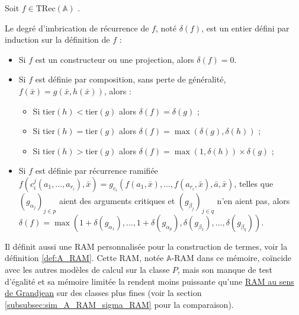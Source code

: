\documentclass{report}
\newcommand{\bbA}{\mathbb{A}}
\newcommand{\TRec}[1]{\text{TRec}\left(\mathbb{#1}\right)}
\begin{document}
		
		\begin{definition}
			\label{def:degre_recurrence}
			
			Soit $f \in \TRec{A}$ \footnotemark. 
			
			
			Le degré d'imbrication de récurrence de $f$, noté $\delta(f)$, est un entier défini par induction sur la définition de $f$ :
			
			\begin{itemize}[itemsep=-1mm]
				\item 	Si $f$ est un constructeur ou une projection, alors $\delta(f) = 0$.
				\item 	Si $f$ est définie par composition, sans perte de généralité, $f(\bar{x}) = g\left( \bar{x}, h\left( \bar{x}\right)\right)$, alors :
				
						\begin{itemize}[itemsep=-1mm]
							\item 	Si $\text{tier}(h) < \text{tier}(g)$ alors $\delta(f) = \delta(g)$ ;
							\item 	Si $\text{tier}(h) = \text{tier}(g)$ alors $\delta(f) = \max\left(\delta(g), \delta(h)\right)$ ;
							\item 	Si $\text{tier}(h) > \text{tier}(g)$ alors $\delta(f) = \max\left(1, \delta(h)\right) \times \delta(g)$ ;
						\end{itemize}
						
				\item 	Si $f$ est définie par récurrence ramifiée $f(c_i^j(a_1, \dots, a_{r_i}), \bar{x}) = g_{c_i}\left( f(a_1, \bar{x}), \dots, f(a_{r_i}, \bar{x}), \bar{a}, \bar{x} \right)$, telles que $\left( g_{\alpha_j}\right)_{j\in p}$ aient des arguments critiques et $\left( g_{\beta_j}\right)_{j\in q}$ n'en aient pas, alors $\delta(f) = \max\left( 1 + \delta\left( g_{\alpha_1} \right), \dots,  1 + \delta\left( g_{\alpha_p} \right), \delta\left( g_{\beta_1} \right), \dots,  \delta\left( g_{\beta_q} \right)\right)$. 
			\end{itemize}
		\end{definition}
		
		
		Il définit aussi une RAM personnalisée pour la construction de termes, voir la définition \ref{def:A_RAM}. Cette RAM, notée $\bbA$-RAM dans ce mémoire, coïncide avec les autres modèles de calcul sur la classe $P$, mais son manque de test d'égalité et sa mémoire limitée la rendent moins puissante qu'une \hyperref[def:sigma_RAM]{RAM au sens de Grandjean} \cite{GrandjeanSchwentick2002} sur des classes plus fines (voir la section \ref{subsubsec:sim_A_RAM_sigma_RAM} pour la comparaison).
		
\end{document}
